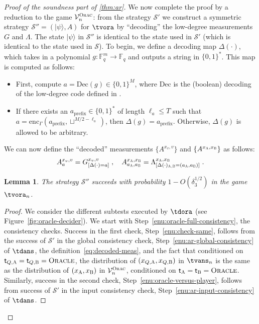 \documentclass[11pt]{article}
\newtheorem{lemma}[theorem]{Lemma}
\theoremstyle{definition}
\newcommand{\ket}[1]{|#1\rangle}
\newcommand{\F}{\ensuremath{\mathbb{F}}}
\newcommand{\verifier}{\mathcal{V}}
\newcommand{\strategy}{\mathscr{S}}
\newcommand{\gamestyle}[1]{\ensuremath{\textsc{#1}}\xspace}
\newcommand{\ora}{\gamestyle{Orac}}
\newcommand{\labelstyle}[1]{\ensuremath{\textsc{#1}}\xspace}
\newcommand{\tvarstyle}[1]{\mathsf{#1}}
\newcommand{\tvar}{\ensuremath{\tvarstyle{t}}}
\newcommand{\alice}{\labelstyle{A}}
\newcommand{\bob}{\labelstyle{B}}
\newcommand{\oracle}{\labelstyle{Oracle}}
\newcommand{\coded}{\mathrm{Dec}}
\begin{document}
\begin{proof}[Proof of the soundness part of \cref{thm:ar}]
We now complete the proof by a reduction to the game $\verifier_n^\ora$: from
the strategy $\strategy'$ we construct a symmetric strategy $\strategy'' =
(\ket{\psi}, A)$ for $\tvora$ by ``decoding'' the low-degree
measurements $G$ and $\Lambda$.
The state $\ket{\psi}$ in $\strategy''$ is identical to the state used in
$\strategy'$ (which is identical to the state used in $\strategy$).
To begin, we define a decoding map $\Delta(\cdot)$, which takes in a polynomial
$g:\F_q^m \to \F_q$ and outputs a string in $\{0,1\}^*$.
This map is computed as follows:
\begin{itemize}
\item First, compute $a = \coded(g) \in \{0,1\}^M$, where $\coded$ is the
  (boolean) decoding of the low-degree code defined in .
\item If there exists an $a_{\mathrm{prefix}} \in \{0, 1\}^*$ of length $\ell_a \leq T$
  such that $a = \mathrm{enc}_\Gamma(a_{\mathrm{prefix}}, \sqcup^{M/2 - \ell_a})$,
  then $\Delta(g) = a_{\mathrm{prefix}}$.
  Otherwise, $\Delta(g)$ is allowed to be arbitrary.
\end{itemize}
We can now define the ``decoded'' measurements $\{A^{{x}_v,v}\}$ and
$\{{A}^{{x}_\alice,{x}_\bob}\}$ as follows:
\begin{equation}
  \label{eq:decoded-meas}
  A^{{x}_v,v}_a  = G^{{x}_v, v}_{[\Delta(\cdot)=a]} \;,\quad
  A^{{x}_\alice,{x}_\bob}_{a_\alice, a_\bob}  =
  \Lambda^{{x}_\alice,{x}_\bob}_{[\Delta(\cdot)_{\alice,\bob}=(a_\alice,a_\bob)]}\;.
\end{equation}
  


\begin{lemma}\label{lem:ar-ora}
  The strategy $\strategy''$ succeeds with probability $1-O(\delta_3^{1/2})$ in the
  game $\tvora_n$.
\end{lemma}
	
\begin{proof}
  We consider the different subtests executed by $\tdora$ (see
  Figure~\ref{fig:oracle-decider}).
  We start with Step~\ref{enu:oracle-full-consistency}, the consistency checks.
  Success in the first check, Step~\ref{enu:check-same}, follows from the success of
  $\strategy'$ in the global consistency check,
  Step~\ref{enu:ar-global-consistency} of $\tdans$, the
  definition~\eqref{eq:decoded-meas}, and the fact that conditioned on
  $\tvar_{Q,\alice}=\tvar_{Q,\bob}=\oracle$, the distribution of
  $(x_{Q,\alice},x_{Q,\bob})$ in $\tvans_n$ is the same as the
  distribution of $(x_{\alice},x_{\bob})$ in $\verifier_n^\ora$, conditioned on
  $\tvar_\alice = \tvar_\bob = \oracle$.
  Similarly, success in the second check, Step~\ref{enu:oracle-versus-player},
  follows from success of $\strategy'$ in the input consistency check,
  Step~\ref{enu:ar-input-consistency} of $\tdans$.


\end{proof}
\end{proof}
\end{document}
